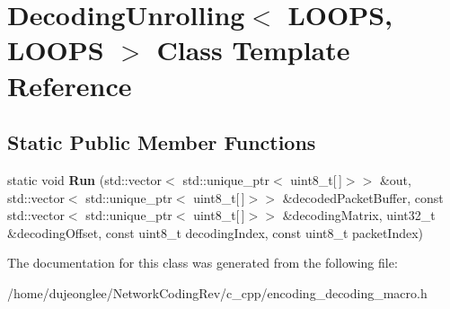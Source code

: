 \hypertarget{class_decoding_unrolling_3_01_l_o_o_p_s_00_01_l_o_o_p_s_01_4}{}\section{Decoding\+Unrolling$<$ L\+O\+O\+PS, L\+O\+O\+PS $>$ Class Template Reference}
\label{class_decoding_unrolling_3_01_l_o_o_p_s_00_01_l_o_o_p_s_01_4}
\subsection*{Static Public Member Functions}
\begin{DoxyCompactItemize}
\item 
static void {\bfseries Run} (std\+::vector$<$ std\+::unique\+\_\+ptr$<$ uint8\+\_\+t\mbox{[}$\,$\mbox{]}$>$$>$ \&out, std\+::vector$<$ std\+::unique\+\_\+ptr$<$ uint8\+\_\+t\mbox{[}$\,$\mbox{]}$>$$>$ \&decoded\+Packet\+Buffer, const std\+::vector$<$ std\+::unique\+\_\+ptr$<$ uint8\+\_\+t\mbox{[}$\,$\mbox{]}$>$$>$ \&decoding\+Matrix, uint32\+\_\+t \&decoding\+Offset, const uint8\+\_\+t decoding\+Index, const uint8\+\_\+t packet\+Index)\hypertarget{class_decoding_unrolling_3_01_l_o_o_p_s_00_01_l_o_o_p_s_01_4_addb067d41781dd919d9a1735a4744e24}{}\label{class_decoding_unrolling_3_01_l_o_o_p_s_00_01_l_o_o_p_s_01_4_addb067d41781dd919d9a1735a4744e24}

\end{DoxyCompactItemize}


The documentation for this class was generated from the following file\+:\begin{DoxyCompactItemize}
\item 
/home/dujeonglee/\+Network\+Coding\+Rev/c\+\_\+cpp/encoding\+\_\+decoding\+\_\+macro.\+h\end{DoxyCompactItemize}
